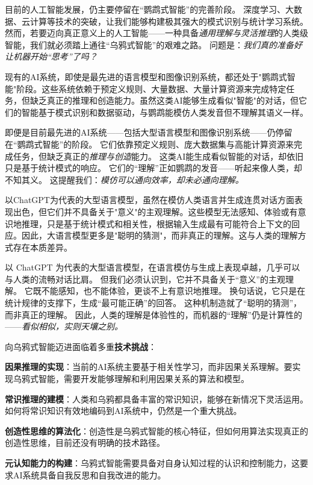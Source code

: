 目前的人工智能发展，仍主要停留在“鹦鹉式智能”的完善阶段。
深度学习、大数据、云计算等技术的突破，让我们能够构建极其强大的模式识别与统计学习系统。
然而，若要迈向真正意义上的人工智能——一种具备\emph{通用理解与灵活推理}的人类级智能，我们就必须踏上通往“乌鸦式智能”的艰难之路。
问题是：\emph{我们真的准备好让机器开始“思考”了吗？}

现有的AI系统，即使是最先进的语言模型和图像识别系统，都还处于"鹦鹉式智能"阶段。这些系统依赖于预定义规则、大量数据、大量计算资源来完成特定任务，但缺乏真正的推理和创造能力。虽然这类AI能够生成看似"智能"的对话，但它们的智能基于模式识别和数据驱动，与鹦鹉能模仿人类发音但不理解其语义一样。

即便是目前最先进的AI系统——包括大型语言模型和图像识别系统——仍停留在“鹦鹉式智能”的阶段。
它们依靠预定义规则、庞大数据集与高能计算资源来完成任务，但缺乏真正的\emph{推理与创造}能力。
这类AI能生成看似智能的对话，却依旧只是基于统计模式的响应。
它们的“理解”正如鹦鹉的发音——听起来像人类，却不知其义。
这提醒我们：\emph{模仿可以通向效率，却未必通向理解。}

以ChatGPT为代表的大型语言模型，虽然在模仿人类语言并生成连贯对话方面表现出色，但它们并不具备关于"意义"的主观理解。这些模型无法感知、体验或有意识地推理，只是基于统计模式和相关性，根据输入生成最有可能符合上下文的回应。因此，大语言模型更多是"聪明的猜测"，而非真正的理解。这与人类的理解方式存在本质差异。

以 ChatGPT 为代表的大型语言模型，在语言模仿与生成上表现卓越，几乎可以与人类的流畅对话比肩。
但我们必须认识到，它并不具备关于“意义”的主观理解。
它既不能感知，也不能体验，更谈不上有意识地推理。
换句话说，它只是在统计规律的支撑下，生成“最可能正确”的回答。
这种机制造就了“聪明的猜测”，而非真正的理解。
因此，人类的理解是体验性的，而机器的“理解”仍是计算性的——\emph{看似相似，实则天壤之别。}

向乌鸦式智能迈进面临着多重\textbf{技术挑战}：

\textbf{因果推理的实现}：当前的AI系统主要基于相关性学习，而非因果关系理解。要实现乌鸦式智能，需要开发能够理解和利用因果关系的算法和模型。

\textbf{常识推理的建模}：人类和乌鸦都具备丰富的常识知识，能够在新情况下灵活运用。如何将常识知识有效地编码到AI系统中，仍然是一个重大挑战。

\textbf{创造性思维的算法化}：创造性是乌鸦式智能的核心特征，但如何用算法实现真正的创造性思维，目前还没有明确的技术路径。

\textbf{元认知能力的构建}：乌鸦式智能需要具备对自身认知过程的认识和控制能力，这要求AI系统具备自我反思和自我改进的能力。

